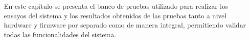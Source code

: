 En este capítulo se presenta el banco de pruebas utilizado para realizar los ensayos del sistema y los resultados obtenidos de las pruebas  tanto a nivel hardware y firmware por separado como de manera integral, permitiendo validar todas las funcionalidades del sistema. 